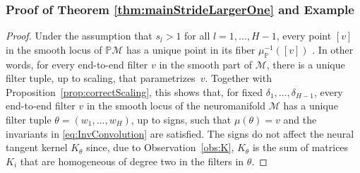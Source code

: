 \documentclass[twoside]{article}
\theoremstyle{definition}
\theoremstyle{remark}
\begin{document}
\subsubsection{Proof of Theorem \ref{thm:mainStrideLargerOne} and Example}
\begin{proof}
Under the assumption that $s_l > 1$ for all $l = 1, \ldots, H-1$, every point $[v]$ in the smooth locus of $\mathbb{P}\mathcal{M}$ has a unique point in its fiber $\mu_\mathbb{P}^{-1}([v])$ \cite[Section~5]{kohn2024function}.
In other words, for every end-to-end filter $v$ in the smooth part of $\mathcal{M}$, there is a unique filter tuple, up to scaling, that parametrizes~$v$.
Together with Proposition~\ref{prop:correctScaling}, this shows that, for fixed $\delta_1, \ldots, \delta_{H-1}$, every end-to-end filter $v$ in the smooth locus of the neuromanifold $\mathcal{M}$ has a unique filter tuple $\theta = (w_1, \ldots, w_H)$, up to signs, such that $\mu(\theta)=v$ and the invariants in \eqref{eq:InvConvolution} are satisfied. 
The signs do not affect the neural tangent kernel $K_\theta$ since, due to Observation~\ref{obs:K}, $K_\theta$ is the sum of matrices $K_i$ that are homogeneous of degree two in the filters in $\theta$.
\end{proof}
\end{document}
